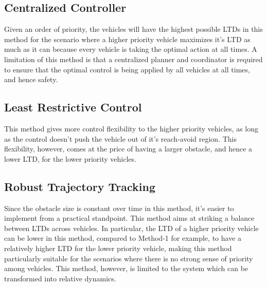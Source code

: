 \subsection{Centralized Controller}
Given an order of priority, the vehicles will have the highest possible LTDs in this method for the scenario where a higher priority vehicle maximizes it's LTD as much as it can because every vehicle is taking the optimal action at all times. 
A limitation of this method is that a centralized planner and coordinator is required to ensure that the optimal control is being applied by all vehicles at all times, and hence safety.

\subsection{Least Restrictive Control}
This method gives more control flexibility to the higher priority vehicles, as long as the control doesn't push the vehicle out of it's reach-avoid region. This flexibility, however, comes at the price of having a larger obstacle, and hence a lower LTD, for the lower priority vehicles.  

\subsection{Robust Trajectory Tracking}
Since the obstacle size is constant over time in this method, it's easier to implement from a practical standpoint. This method aims at striking a balance between LTDs across vehicles. In particular, the LTD of a higher priority vehicle can be lower in this method, compared to Method-1 for example, to have a relatively higher LTD for the lower priority vehicle, making this method particularly suitable for the scenarios where there is no strong sense of priority among vehicles. This method, however, is limited to the system which can be transformed into relative dynamics.